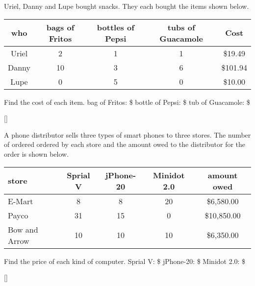 \documentclass[12pt,letterpaper]{memoir}
\begin{document}
%
%
\myWideProblemWithContent
{
    Uriel, Danny and Lupe bought snacks. 
    They each bought the items shown below.
    \begin{center}
        \small
        \begin{tabular}{ccccc}
            who & bags of Fritos & bottles of Pepsi & tubs of Guacamole & Cost \\
            \toprule
            Uriel & 2 & 1 & 1  & \$19.49  \\
            Danny & 10 & 3 & 6 & \$101.94  \\
            Lupe  & 0 & 5 &  0 & \$10.00  \\
        \end{tabular}
    \end{center}
    Find the cost of each item.
    \mySystemTable[7]
    \small
    bag of Fritos: \$
    \hfill 
    bottle of Pepsi: \$
    \hfill 
    tub of Guacamole: \$
    }[\small]

\vfill
%
%
\myWideProblemWithContent
{
    A phone distributor sells three types of smart phones  
    to three stores. 
    The number of ordered ordered by each store and the amount owed to the
    distributor for the order is shown below.
    \begin{center}
        \small
        \begin{tabular}{lcccc}
            store & Sprial V & jPhone-20 & Minidot 2.0 & amount owed \\
            \toprule
            E-Mart & 8 & 8 & 20 & \$6,580.00  \\
            Payco    & 31  & 15 & 0 & \$10,850.00  \\
            Bow and Arrow   & 10  & 10 & 10 & \$6,350.00  \\
        \end{tabular}
    \end{center}
    Find the price of each kind of computer.
    \mySystemTable[7]
    \small
    Sprial V: \$
    \hfil 
    jPhone-20: \$
    \hfil 
    Minidot 2.0: \$
    }[\small]
\end{document}
